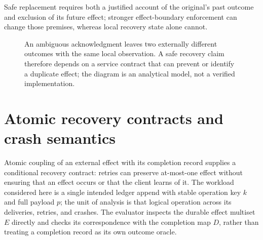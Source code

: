 \documentclass[11pt]{article}
\begin{document}
Safe replacement requires both a justified account of the original's past outcome and exclusion of its future effect; stronger effect-boundary enforcement can change those premises, whereas local recovery state alone cannot.

\begin{figure}[!htbp]
\centering
{}
\caption{An ambiguous acknowledgment leaves two externally different outcomes with the same local observation. A safe recovery claim therefore depends on a service contract that can prevent or identify a duplicate effect; the diagram is an analytical model, not a verified implementation.}
\par{}
\end{figure}
\section{Atomic recovery contracts and crash semantics}
Atomic coupling of an external effect with its completion record supplies a conditional recovery contract: retries can preserve at-most-one effect without ensuring that an effect occurs or that the client learns of it. The workload considered here is a single intended ledger append with stable operation key $k$ and full payload $p$; the unit of analysis is that logical operation across its deliveries, retries, and crashes. The evaluator inspects the durable effect multiset $E$ directly and checks its correspondence with the completion map $D$, rather than treating a completion record as its own outcome oracle.
\end{document}
